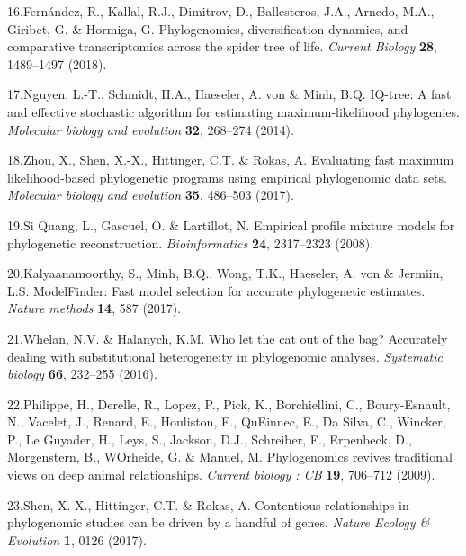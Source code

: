 \documentclass[]{article}
\begin{document}
\leavevmode\hypertarget{ref-fernandez2018phylogenomics}{}%
16.Fernández, R., Kallal, R.J., Dimitrov, D., Ballesteros, J.A., Arnedo,
M.A., Giribet, G. \& Hormiga, G. Phylogenomics, diversification
dynamics, and comparative transcriptomics across the spider tree of
life. \emph{Current Biology} \textbf{28}, 1489--1497 (2018).

\leavevmode\hypertarget{ref-nguyen2014iq}{}%
17.Nguyen, L.-T., Schmidt, H.A., Haeseler, A. von \& Minh, B.Q. IQ-tree:
A fast and effective stochastic algorithm for estimating
maximum-likelihood phylogenies. \emph{Molecular biology and evolution}
\textbf{32}, 268--274 (2014).

\leavevmode\hypertarget{ref-zhou2017evaluating}{}%
18.Zhou, X., Shen, X.-X., Hittinger, C.T. \& Rokas, A. Evaluating fast
maximum likelihood-based phylogenetic programs using empirical
phylogenomic data sets. \emph{Molecular biology and evolution}
\textbf{35}, 486--503 (2017).

\leavevmode\hypertarget{ref-si2008empirical}{}%
19.Si Quang, L., Gascuel, O. \& Lartillot, N. Empirical profile mixture
models for phylogenetic reconstruction. \emph{Bioinformatics}
\textbf{24}, 2317--2323 (2008).

\leavevmode\hypertarget{ref-kalyaanamoorthy2017modelfinder}{}%
20.Kalyaanamoorthy, S., Minh, B.Q., Wong, T.K., Haeseler, A. von \&
Jermiin, L.S. ModelFinder: Fast model selection for accurate
phylogenetic estimates. \emph{Nature methods} \textbf{14}, 587 (2017).

\leavevmode\hypertarget{ref-whelan2016let}{}%
21.Whelan, N.V. \& Halanych, K.M. Who let the cat out of the bag?
Accurately dealing with substitutional heterogeneity in phylogenomic
analyses. \emph{Systematic biology} \textbf{66}, 232--255 (2016).

\leavevmode\hypertarget{ref-Philippe:2009hh}{}%
22.Philippe, H., Derelle, R., Lopez, P., Pick, K., Borchiellini, C.,
Boury-Esnault, N., Vacelet, J., Renard, E., Houliston, E., QuEinnec, E.,
Da Silva, C., Wincker, P., Le Guyader, H., Leys, S., Jackson, D.J.,
Schreiber, F., Erpenbeck, D., Morgenstern, B., WOrheide, G. \& Manuel,
M. Phylogenomics revives traditional views on deep animal relationships.
\emph{Current biology : CB} \textbf{19}, 706--712 (2009).

\leavevmode\hypertarget{ref-shen2017contentious}{}%
23.Shen, X.-X., Hittinger, C.T. \& Rokas, A. Contentious relationships
in phylogenomic studies can be driven by a handful of genes.
\emph{Nature Ecology \& Evolution} \textbf{1}, 0126 (2017).
\end{document}
